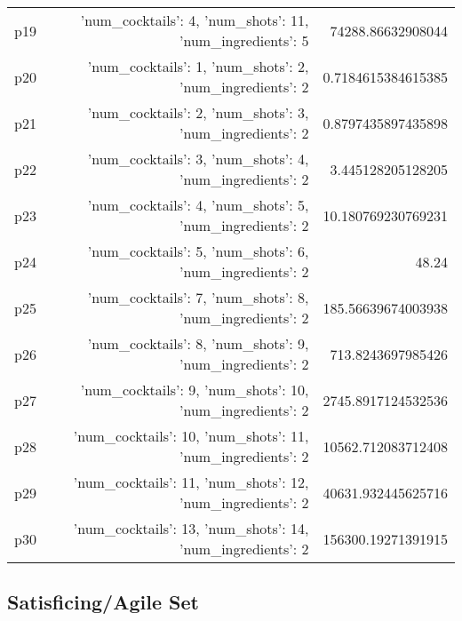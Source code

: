 \documentclass{article}
\begin{document}
\begin{center}
\begin{tabular}{r|r|r}
  p19&{'num\_cocktails': 4, 'num\_shots': 11, 'num\_ingredients': 5}&74288.86632908044\\
  p20&{'num\_cocktails': 1, 'num\_shots': 2, 'num\_ingredients': 2}&0.7184615384615385\\
  p21&{'num\_cocktails': 2, 'num\_shots': 3, 'num\_ingredients': 2}&0.8797435897435898\\
  p22&{'num\_cocktails': 3, 'num\_shots': 4, 'num\_ingredients': 2}&3.445128205128205\\
  p23&{'num\_cocktails': 4, 'num\_shots': 5, 'num\_ingredients': 2}&10.180769230769231\\
  p24&{'num\_cocktails': 5, 'num\_shots': 6, 'num\_ingredients': 2}&48.24\\
  p25&{'num\_cocktails': 7, 'num\_shots': 8, 'num\_ingredients': 2}&185.56639674003938\\
  p26&{'num\_cocktails': 8, 'num\_shots': 9, 'num\_ingredients': 2}&713.8243697985426\\
  p27&{'num\_cocktails': 9, 'num\_shots': 10, 'num\_ingredients': 2}&2745.8917124532536\\
  p28&{'num\_cocktails': 10, 'num\_shots': 11, 'num\_ingredients': 2}&10562.712083712408\\
  p29&{'num\_cocktails': 11, 'num\_shots': 12, 'num\_ingredients': 2}&40631.932445625716\\
  p30&{'num\_cocktails': 13, 'num\_shots': 14, 'num\_ingredients': 2}&156300.19271391915
                            \end{tabular}
                            \end{center}
                    

                                \subsection*{Satisficing/Agile Set}
                                
\end{document}
